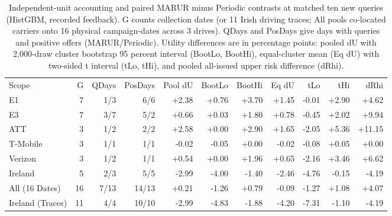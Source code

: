 \begin{table}[!ht]
\centering\small
\caption{Independent-unit accounting and paired MARUR minus Periodic contrasts at matched ten new queries (HistGBM, recorded feedback). G counts collection dates (or 11 Irish driving traces; All pools co-located carriers onto 16 physical campaign-dates across 3 drives). QDays and PosDays give days with queries and positive offers (MARUR/Periodic). Utility differences are in percentage points: pooled dU with 2,000-draw cluster bootstrap 95 percent interval (BootLo, BootHi), equal-cluster mean (Eq dU) with two-sided t interval (tLo, tHi), and pooled all-issued upper risk difference (dRhi).}
\begin{tabular}{lrrrrrrrrrr}
\hline
Scope & G & QDays & PosDays & Pool dU & BootLo & BootHi & Eq dU & tLo & tHi & dRhi \\
E1 & 7 & 1/3 & 6/6 & +2.38 & +0.76 & +3.70 & +1.45 & -0.01 & +2.90 & +4.62 \\
E3 & 7 & 3/7 & 5/2 & +0.66 & +0.03 & +1.80 & +0.78 & -0.45 & +2.02 & +9.94 \\
ATT & 3 & 1/2 & 2/2 & +2.58 & +0.00 & +2.90 & +1.65 & -2.05 & +5.36 & +11.15 \\
T-Mobile & 3 & 1/1 & 1/1 & -0.02 & -0.05 & +0.00 & -0.02 & -0.08 & +0.05 & +0.00 \\
Verizon & 3 & 1/2 & 1/1 & +0.54 & +0.00 & +1.96 & +0.65 & -2.16 & +3.46 & +6.62 \\
Ireland & 5 & 2/3 & 5/5 & -2.99 & -4.00 & -1.40 & -2.46 & -4.76 & -0.15 & -4.19 \\
All (16 Dates) & 16 & 7/13 & 14/13 & +0.21 & -1.26 & +0.79 & -0.09 & -1.27 & +1.08 & +4.07 \\
Ireland (Traces) & 11 & 4/4 & 10/10 & -2.99 & -4.83 & -1.88 & -4.20 & -7.31 & -1.10 & -4.19 \\
\hline
\end{tabular}
\end{table}
